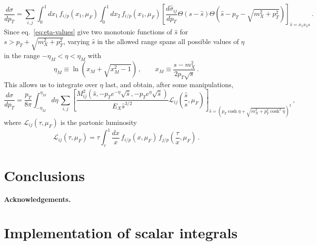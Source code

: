 \documentclass[12pt,a4wide]{article}
\begin{document}
\begin{equation}
\label{eq:hadronic-pt}
  \frac{d\sigma}{dp_T} = \sum_{i,j} \int_0^1 dx_1\, f_{i/p}(x_1,\mu_F)\int_0^1 dx_2 \, f_{i/p}(x_1,\mu_F) \left[\frac{d\hat \sigma_{ij}}{dp_T} \Theta(s-\hat s) \Theta\left(\hat s-p_T-\sqrt{m_X^2+p^2_T}\right)  \right]_{\hat s=x_1x_2 s}\,.
\end{equation}
Since eq.~\eqref{eq:eta-values} give two monotonic functions of $\hat s$ for $s>p_T+\sqrt{m_X^2+p^2_T}$, varying $\hat s$ in the allowed range spans all possible values of $\eta$ in the range $-\eta_M<\eta<\eta_M$ with
\begin{equation}
\label{eq:eta-range}
\eta_M \equiv \ln(x_M + \sqrt{x_M^2-1})\,,\qquad  x_M\equiv\frac{s-m_X^2}{2 p_T \sqrt{s} }\,.
\end{equation}
This allows us to integrate over $\eta$ last, and obtain, after some
manipulations,
\begin{equation}
\label{eq:hadronic-pt-lumi}
  \frac{d\sigma}{dp_T} = \frac{p_T}{8 \pi}\int_{-\eta_M}^{\eta_M}\!d\eta\, \sum_{i,j}  \left[\frac{M^2_{ij}\left(\hat s,-p_T e^{-\eta}\sqrt {\hat s}  ,- p_T e^{\eta}\sqrt{\hat s}\right)}{E_X \hat s^{3/2}}\mathcal{L}_{ij}\left(\frac{\hat s}{s},\mu_F\right) \right]_{\hat s=\left(p_T\cosh\eta+\sqrt{m_X^2+p^2_T\cosh^2\eta}\right)^2}\,,
\end{equation}
where $\mathcal{L}_{ij}\left(\tau,\mu_F\right)$ is the partonic luminosity
\begin{equation}
  \label{eq:hoppet-lumi}
  \mathcal{L}_{ij}\left(\tau,\mu_F\right) = \tau \int_\tau^1 \frac{dx}{x}\, f_{i/p}(x,\mu_F)\, f_{j/p}\left(\frac{\tau}{x},\mu_F\right)\,.
\end{equation}



\section{Conclusions}
\label{sec:the-end}

\paragraph{Acknowledgements.}

\appendix

\section{Implementation of scalar integrals}
\label{sec:scalar-integrals}
\end{document}
